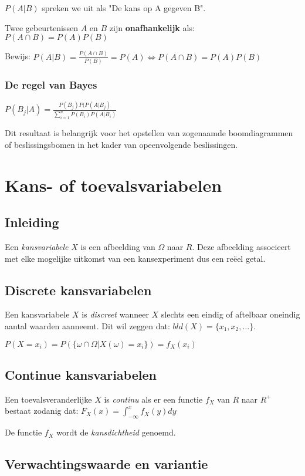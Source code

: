 \documentclass[a4paper,12pt]{article}
\begin{document}
$P(A|B)$ spreken we uit als "De kans op A gegeven B".

Twee gebeurtenissen $A$ en $B$ zijn \textbf{onafhankelijk} als:
$P(A\cap B) = P(A)P(B)$

Bewijs: $P(A|B) = \frac{P(A\cap B)}{P(B)} =P(A) 
\Leftrightarrow P(A\cap B) = P(A)P(B)$

\subsubsection{De regel van Bayes}
$P(B_j|A) = 
\frac{P(B_j)P(P(A|B_j)}{\sum^n_{i=1}P(B_i)P(A|B_i)}$

Dit resultaat is belangrijk voor het opstellen van zogenaamde boomdiagrammen of beslissingsbomen in het kader van opeenvolgende beslissingen.

\section{Kans- of toevalsvariabelen}
\subsection{Inleiding}
Een \textit{kansvariabele} $X$ is een afbeelding van $\Omega$ naar $R$.
Deze afbeelding associeert met elke mogelijke uitkomst van een kansexperiment dus een reëel getal.

\subsection{Discrete kansvariabelen}
Een kansvariabele $X$ is \textit{discreet} wanneer $X$ slechts een eindig of aftelbaar oneindig aantal waarden aanneemt.
Dit wil zeggen dat: $bld(X)=\{x_1,x_2,\dots\}$.

$P(X=x_i)=P(\{\omega \cap \Omega |X(\omega)=x_i\})=f_X(x_i)$

\subsection{Continue kansvariabelen}
Een toevalsveranderlijke $X$ is \textit{continu} als er een functie $f_X$ van $R$ naar $R^+$ bestaat zodanig dat:
$F_X(x)=\int^x_{-\infty}f_X(y)dy$

De functie $f_X$ wordt de \textit{kansdichtheid} genoemd.

\subsection{Verwachtingswaarde en variantie}
\end{document}
